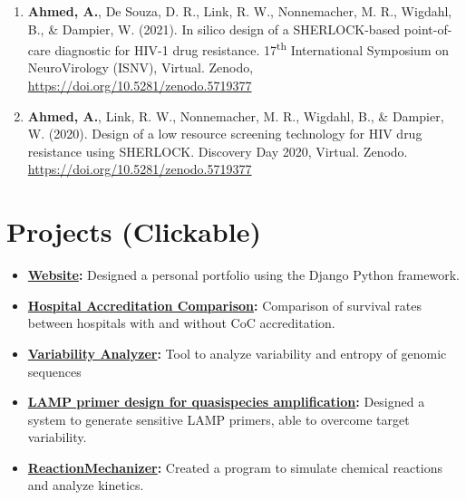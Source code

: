 \documentclass[letterpaper,11pt]{article}
\newcommand{\resumeItem}[2]{
  \item\small{
    \textbf{#1}{ #2 \vspace{-2pt}}
  }
}
\newcommand{\resumeSubItem}[2]{\resumeItem{#1}{#2}\vspace{-4pt}}
\newcommand{\resumeSubHeadingListStart}{\begin{itemize}[leftmargin=*,rightmargin=\dimexpr\linewidth-0.9\textwidth-\leftmargin\relax]}
\newcommand{\resumeSubHeadingListEnd}{\end{itemize}}
\begin{document}
\begin{enumerate}[leftmargin=*]
  \resumeSubItem{}
    {\textbf{Ahmed, A.}, De Souza, D. R., Link, R. W., Nonnemacher, M. R., Wigdahl, B., \& Dampier, W. (2021). In silico design of a SHERLOCK-based point-of-care diagnostic for HIV-1 drug resistance. 17\textsuperscript{th} International Symposium on NeuroVirology (ISNV), Virtual. Zenodo, \href{https://doi.org/10.5281/zenodo.5719377}{https://doi.org/10.5281/zenodo.5719377}}
  \resumeSubItem{}{\textbf{Ahmed, A.}, Link, R. W., Nonnemacher, M. R., Wigdahl, B., \& Dampier, W. (2020). Design of a low resource screening technology for HIV drug resistance using SHERLOCK. Discovery Day 2020, Virtual. Zenodo. \href{https://doi.org/10.5281/zenodo.5719377}{https://doi.org/10.5281/zenodo.5719377}}
  \end{enumerate}
  \vspace{-4pt}

\section{Projects (Clickable)}
  \resumeSubHeadingListStart
    \resumeSubItem{\href{https://ahmed.science}{Website}:}
      {Designed a personal portfolio using the Django Python framework.}
    \resumeSubItem{\href{https://github.com/ArmaanAhmed22/CompareCoCversusNonCoC}{Hospital Accreditation Comparison}:}
      {Comparison of survival rates between hospitals with and without CoC accreditation.}
    \resumeSubItem{\href{https://github.com/ArmaanAhmed22/VariabilityAnalyzer}{Variability Analyzer}:}
      {Tool to analyze variability and entropy of genomic sequences}
    \resumeSubItem{\href{https://github.com/ArmaanAhmed22/NonSpecificLAMPDesign}{LAMP primer design for quasispecies amplification}:}
      {Designed a system to generate sensitive LAMP primers, able to overcome target variability.}
    \resumeSubItem{\href{https://github.com/ArmaanAhmed22/ReactionMechanizer}{ReactionMechanizer}:}
      {Created a program to simulate chemical reactions and analyze kinetics.}
  \resumeSubHeadingListEnd

%
\end{document}
